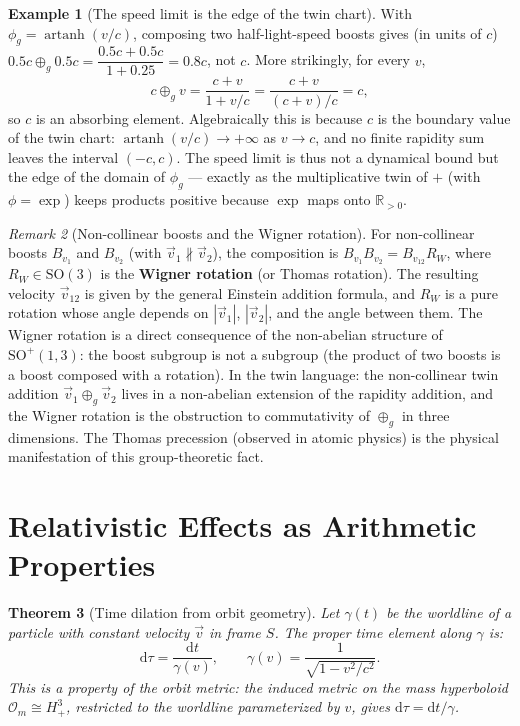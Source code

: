 \documentclass[12pt]{article}
\theoremstyle{plain}
\newtheorem{theorem}{Theorem}[section]
\theoremstyle{definition}
\newtheorem{example}[theorem]{Example}
\theoremstyle{remark}
\newtheorem{remark}[theorem]{Remark}
\newcommand{\R}{\mathbb{R}}
\newcommand{\SO}{\mathrm{SO}}
\newcommand{\dd}{\mathrm{d}}
\begin{document}
\begin{example}[The speed limit is the edge of the twin chart]\label{ex:vel-add}
With $\phi_g=\operatorname{artanh}(v/c)$, composing two half-light-speed boosts gives (in units of $c$)
$0.5c\oplus_g 0.5c=\dfrac{0.5c+0.5c}{1+0.25}=0.8c$, not $c$. More strikingly, for every $v$,
\[
c\oplus_g v=\frac{c+v}{1+v/c}=\frac{c+v}{(c+v)/c}=c,
\]
so $c$ is an absorbing element. Algebraically this is because $c$ is the boundary value of the twin chart:
$\operatorname{artanh}(v/c)\to+\infty$ as $v\to c$, and no finite rapidity sum leaves the interval $(-c,c)$. The
speed limit is thus not a dynamical bound but the edge of the domain of $\phi_g$ --- exactly as the
multiplicative twin of $+$ (with $\phi=\exp$) keeps products positive because $\exp$ maps onto $\R_{>0}$.
\end{example}

\begin{remark}[Non-collinear boosts and the Wigner rotation]\label{rmk:wigner}
For non-collinear boosts $B_{v_1}$ and $B_{v_2}$ (with $\vec{v}_1 \not\parallel \vec{v}_2$), the composition is $B_{v_1}B_{v_2} = B_{v_{12}}R_W$, where $R_W \in \SO(3)$ is the \textbf{Wigner rotation} (or Thomas rotation). The resulting velocity $\vec{v}_{12}$ is given by the general Einstein addition formula, and $R_W$ is a pure rotation whose angle depends on $|\vec{v}_1|$, $|\vec{v}_2|$, and the angle between them. The Wigner rotation is a direct consequence of the non-abelian structure of $\SO^+(1,3)$: the boost subgroup is not a subgroup (the product of two boosts is a boost composed with a rotation). In the twin language: the non-collinear twin addition $\vec{v}_1 \oplus_g \vec{v}_2$ lives in a non-abelian extension of the rapidity addition, and the Wigner rotation is the obstruction to commutativity of $\oplus_g$ in three dimensions. The Thomas precession (observed in atomic physics) is the physical manifestation of this group-theoretic fact.
\end{remark}


\section{Relativistic Effects as Arithmetic Properties}
\label{sec:effects}

\begin{theorem}[Time dilation from orbit geometry]\label{thm:dilation}
Let $\gamma(t)$ be the worldline of a particle with constant velocity $\vec{v}$ in frame $S$. The proper time element along $\gamma$ is:
\begin{equation}
\dd\tau = \frac{\dd t}{\gamma(v)}, \qquad \gamma(v) = \frac{1}{\sqrt{1 - v^2/c^2}}.
\end{equation}
This is a property of the orbit metric: the induced metric on the mass hyperboloid $\mathcal{O}_m \cong H^3_+$, restricted to the worldline parameterized by $v$, gives $\dd\tau = \dd t/\gamma$.
\end{theorem}
\end{document}
